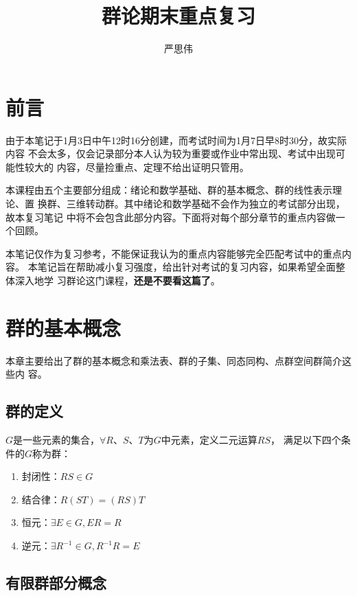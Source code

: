 \documentclass{ctexart}
\begin{document}
\title{群论期末重点复习}
\author{严思伟}
\maketitle

\tableofcontents
\newpage

\setcounter{page}{1}

\section{前言}

由于本笔记于1月3日中午12时16分创建，而考试时间为1月7日早8时30分，故实际内容
不会太多，仅会记录部分本人认为较为重要或作业中常出现、考试中出现可能性较大的
内容，尽量捡重点、定理不给出证明只管用。

本课程由五个主要部分组成：绪论和数学基础、群的基本概念、群的线性表示理论、置
换群、三维转动群。其中绪论和数学基础不会作为独立的考试部分出现，故本复习笔记
中将不会包含此部分内容。下面将对每个部分章节的重点内容做一个回顾。

本笔记仅作为复习参考，不能保证我认为的重点内容能够完全匹配考试中的重点内容。
本笔记旨在帮助减小复习强度，给出针对考试的复习内容，如果希望全面整体深入地学
习群论这门课程，\textbf{还是不要看这篇了}。

\section{群的基本概念}

本章主要给出了群的基本概念和乘法表、群的子集、同态同构、点群空间群简介这些内
容。

\subsection{群的定义}

$G$是一些元素的集合，$\forall R$、$S$、$T$为$G$中元素，定义二元运算$RS$，
满足以下四个条件的$G$称为群：

\begin{enumerate}
    \item 封闭性：$RS\in G$
    \item 结合律：$R(ST)=(RS)T$
    \item 恒元：$\exists E\in G, ER=R$
    \item 逆元：$\exists R^{-1}\in G, R^{-1}R=E$
\end{enumerate}

\subsection{有限群部分概念}
\end{document}
